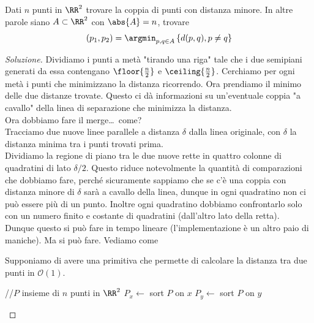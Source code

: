 \documentclass[11pt]{scrartcl}
\newcommand{\bigo}{\mathcal{O}}
\begin{document}
	\begin{problem}
		Dati $n$ punti in $\RR^2$ trovare la coppia di punti con distanza minore. In altre parole siano $A\subset \RR^2$ con $\abs{A}=n$, trovare
		$$(p_1,p_2)=\argmin_{p,q\in A}\left\{d(p,q),p\ne q\right\}$$
	\end{problem}
	\newpage
	\begin{proof}[Soluzione]
		Dividiamo i punti a metà "tirando una riga" tale che i due semipiani generati da essa contengano $\floor{\frac{n}{2}}$ e $\ceiling{\frac{n}{2}}$. Cerchiamo per ogni metà i punti che minimizzano la distanza ricorrendo. Ora prendiamo il minimo delle due distanze trovate. Questo ci dà informazioni su un'eventuale coppia "a cavallo" della linea di separazione che minimizza la distanza. \\
		Ora dobbiamo fare il merge\dots\, come? \\
		Tracciamo due nuove linee parallele a distanza $\delta$ dalla linea originale, con $\delta$ la distanza minima tra i punti trovati prima. \\
		Dividiamo la regione di piano tra le due nuove rette in quattro colonne di quadratini di lato $\delta/2$. Questo riduce notevolmente la quantità di comparazioni che dobbiamo fare, perché sicuramente sappiamo che se c'è una coppia con distanza minore di $\delta$ sarà a cavallo della linea, dunque in ogni quadratino non ci può essere più di un punto. Inoltre ogni quadratino dobbiamo confrontarlo solo con un numero finito  e costante di quadratini (dall'altro lato della retta). \\
		Dunque questo si può fare in tempo lineare (l'implementazione è un altro paio di maniche). Ma si può fare. Vediamo come
		\begin{algorithm}[Soluzione]
			Supponiamo di avere una primitiva  che permette di calcolare la distanza tra due punti in $\bigo(1)$.
			\begin{algorithmic}[1]
				 //$P$ insieme di $n$ punti in $\RR^2$
					\State $P_x\gets $ sort $P$ on $x$
					\State $P_y\gets $ sort $P$ on $y$ 
					\State \Return {}
				\EndFunction
				

\end{algorithmic}
\end{algorithm}
\end{proof}
\end{document}
